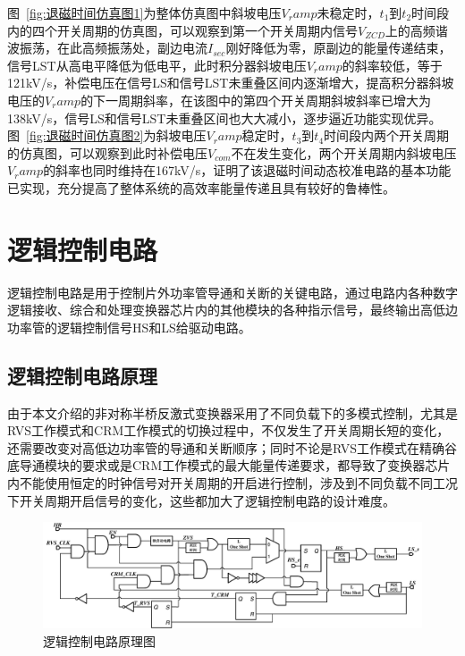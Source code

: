 图~\ref{fig:退磁时间仿真图1}为整体仿真图中斜坡电压$V_ramp$未稳定时，$t_1$到$t_2$时间段内的四个开关周期的仿真图，可以观察到第一个开关周期内信号$V_{ZCD}$上的高频谐波振荡，在此高频振荡处，副边电流$I_{sec}$刚好降低为零，原副边的能量传递结束，信号LST从高电平降低为低电平，此时积分器斜坡电压$V_ramp$的斜率较低，等于121kV/s，补偿电压在信号LS和信号LST未重叠区间内逐渐增大，提高积分器斜坡电压的$V_ramp$的下一周期斜率，在该图中的第四个开关周期斜坡斜率已增大为138kV/s，信号LS和信号LST未重叠区间也大大减小，逐步逼近功能实现优异。图~\ref{fig:退磁时间仿真图2}为斜坡电压$V_ramp$稳定时，$t_3$到$t_4$时间段内两个开关周期的仿真图，可以观察到此时补偿电压$V_{com}$不在发生变化，两个开关周期内斜坡电压$V_ramp$的斜率也同时维持在167kV/s，证明了该退磁时间动态校准电路的基本功能已实现，充分提高了整体系统的高效率能量传递且具有较好的鲁棒性。












\section{逻辑控制电路}

逻辑控制电路是用于控制片外功率管导通和关断的关键电路，通过电路内各种数字逻辑接收、综合和处理变换器芯片内的其他模块的各种指示信号，最终输出高低边功率管的逻辑控制信号HS和LS给驱动电路。

\subsection{逻辑控制电路原理}

由于本文介绍的非对称半桥反激式变换器采用了不同负载下的多模式控制，尤其是RVS工作模式和CRM工作模式的切换过程中，不仅发生了开关周期长短的变化，还需要改变对高低边功率管的导通和关断顺序；同时不论是RVS工作模式在精确谷底导通模块的要求或是CRM工作模式的最大能量传递要求，都导致了变换器芯片内不能使用恒定的时钟信号对开关周期的开启进行控制，涉及到不同负载不同工况下开关周期开启信号的变化，这些都加大了逻辑控制电路的设计难度。

\begin{figure}[htbp] 
    \centering
    \includegraphics[width=1.0\linewidth]{figures/逻辑控制电路.pdf}
    \caption{逻辑控制电路原理图}
    \label{fig:逻辑控制电路原理图}
\end{figure} 

